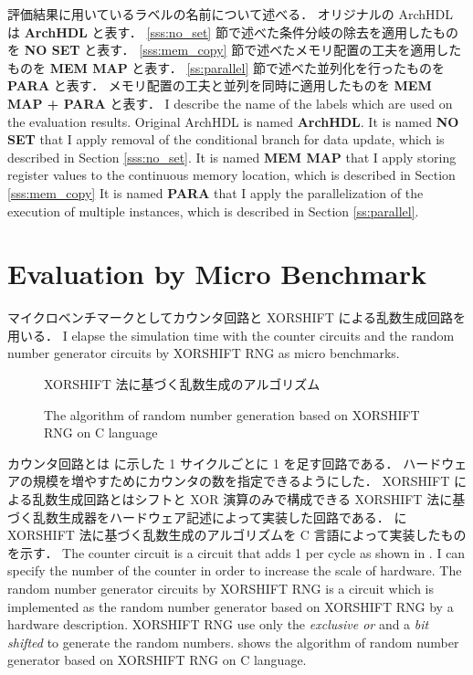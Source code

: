 評価結果に用いているラベルの名前について述べる．
オリジナルの ArchHDL は \textbf{ArchHDL} と表す．
\ref{sss:no_set} 節で述べた条件分岐の除去を適用したものを \textbf{NO SET} と表す．
\ref{sss:mem_copy} 節で述べたメモリ配置の工夫を適用したものを \textbf{MEM MAP} と表す．
\ref{ss:parallel} 節で述べた並列化を行ったものを \textbf{PARA} と表す．
メモリ配置の工夫と並列を同時に適用したものを \textbf{MEM MAP + PARA} と表す．
\fi
I describe the name of the labels which are used on the evaluation results.
Original ArchHDL is named \textbf{ArchHDL}.
It is named \textbf{NO SET} that I apply removal of the conditional branch for data update, which is described in Section \ref{sss:no_set}.
It is named \textbf{MEM MAP} that I apply storing register values to the continuous memory location, which is described in Section \ref{sss:mem_copy}
It is named \textbf{PARA} that I apply the parallelization of the execution of multiple instances, which is described in Section \ref{ss:parallel}.


\section{Evaluation by Micro Benchmark}

マイクロベンチマークとしてカウンタ回路と XORSHIFT による乱数生成回路を用いる．
\fi
I elapse the simulation time with the counter circuits and the random number generator circuits by XORSHIFT RNG as micro benchmarks.

\begin{figure}[tb]
 
 \caption{XORSHIFT 法に基づく乱数生成のアルゴリズム}
\fi
 \caption{The algorithm of random number generation based on XORSHIFT RNG on C language}
 \label{src:xorshift_alg}
\end{figure}

カウンタ回路とは  に示した 1 サイクルごとに 1 を足す回路である．
ハードウェアの規模を増やすためにカウンタの数を指定できるようにした．
XORSHIFT による乱数生成回路とはシフトと XOR 演算のみで構成できる XORSHIFT 法に基づく乱数生成器をハードウェア記述によって実装した回路である．
 に XORSHIFT 法に基づく乱数生成のアルゴリズムを C 言語によって実装したものを示す．
\fi
The counter circuit is a circuit that adds 1 per cycle as shown in .
I can specify the number of the counter in order to increase the scale of hardware.
The random number generator circuits by XORSHIFT RNG is a circuit which is implemented as the random number generator based on XORSHIFT RNG by a hardware description.
XORSHIFT RNG use only the \textit{exclusive or} and a \textit{bit shifted} to generate the random numbers.
 shows the algorithm of random number generator based on XORSHIFT RNG on C language.

